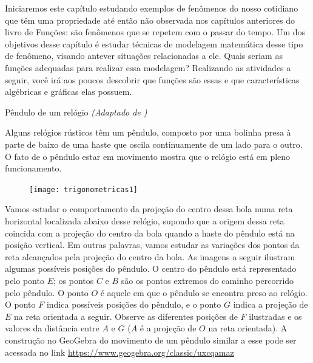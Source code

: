 \mainmatter


\label{trig-exp1}

Iniciaremos este capítulo estudando exemplos de fenômenos do nosso cotidiano que têm uma propriedade até então não observada nos capítulos anteriores do livro de Funções: são fenômenos que se repetem com o passar do tempo. Um dos objetivos desse capítulo é estudar técnicas de modelagem matemática desse tipo de fenômeno, visando antever situações relacionadas a ele. Quais seriam as funções adequadas para realizar essa modelagem? Realizando as atividades a seguir, você irá aos poucos descobrir que funções são essas e que características algébricas e gráficas elas possuem.



\begin{task}{Pêndulo de um relógio}
\textit{(Adaptado de \cite{costa2017})}
\label{trig-ativ1}

Alguns relógios rústicos têm um pêndulo, composto por uma bolinha presa à parte de baixo de uma haste que oscila continuamente de um lado para o outro. O fato de o pêndulo estar em movimento mostra que o relógio está em pleno funcionamento.

\begin{figure}[H]
\centering

\texttt{[image: trigonometricas1]}
\end{figure}

Vamos estudar o comportamento da projeção do centro dessa bola numa reta horizontal localizada abaixo desse relógio, supondo que a origem dessa reta coincida com a projeção do centro da bola quando a haste do pêndulo está na posição vertical. Em outras palavras, vamos estudar as variações dos pontos da reta alcançados pela projeção do centro da bola. As imagens a seguir ilustram algumas possíveis posições do pêndulo. O centro do pêndulo está representado pelo ponto $E$; os pontos $C$ e $B$ são os pontos extremos do caminho percorrido pelo pêndulo. O ponto $O$ é aquele em que o pêndulo se encontra preso ao relógio. O ponto $F$ indica possíveis posições do pêndulo, e o ponto $G$ indica a projeção de $E$ na reta orientada a seguir. Observe as diferentes posições de $F$ ilustradas e os valores da distância entre $A$ e $G$ ($A$ é a projeção de $O$ na reta orientada). A construção no GeoGebra do movimento de um pêndulo similar a esse pode ser acessada no link \url{https://www.geogebra.org/classic/uxcqamaz}


\begin{figure}[H]
\centering


\end{figure}
\end{task}
